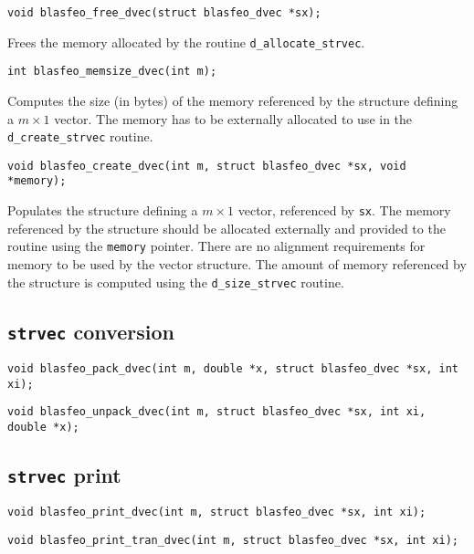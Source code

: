 \documentclass[a4paper]{report}
\begin{document}
\begin{verbatim}
void blasfeo_free_dvec(struct blasfeo_dvec *sx);
\end{verbatim}
Frees the memory allocated by the routine {\tt d\_allocate\_strvec}.

\begin{verbatim}
int blasfeo_memsize_dvec(int m);
\end{verbatim}
Computes the size (in bytes) of the memory referenced by the structure defining a $m\times 1$ vector.
The memory has to be externally allocated to use in the {\tt d\_create\_strvec} routine.

\begin{verbatim}
void blasfeo_create_dvec(int m, struct blasfeo_dvec *sx, void *memory);
\end{verbatim}
Populates the structure defining a $m\times 1$ vector, referenced by {\tt sx}.
The memory referenced by the structure should be allocated externally and provided to the routine using the {\tt memory} pointer.
There are no alignment requirements for memory to be used by the vector structure. %
The amount of memory referenced by the structure is computed using the {\tt d\_size\_strvec} routine.



\subsection{{\tt strvec} conversion}

\begin{verbatim}
void blasfeo_pack_dvec(int m, double *x, struct blasfeo_dvec *sx, int xi);
\end{verbatim}

\begin{verbatim}
void blasfeo_unpack_dvec(int m, struct blasfeo_dvec *sx, int xi, double *x);
\end{verbatim}



\subsection{{\tt strvec} print}

\begin{verbatim}
void blasfeo_print_dvec(int m, struct blasfeo_dvec *sx, int xi);
\end{verbatim}

\begin{verbatim}
void blasfeo_print_tran_dvec(int m, struct blasfeo_dvec *sx, int xi);
\end{verbatim}
\end{document}
